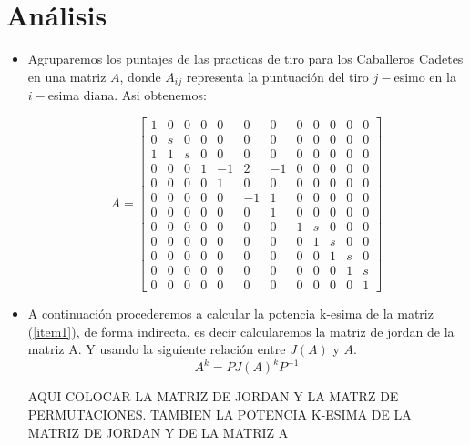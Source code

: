 \documentclass[12pt,a4paper]{article}
\begin{document}
\section{Análisis}
\begin{itemize}

	\item Agruparemos los puntajes de las practicas de tiro para los Caballeros Cadetes en una matriz $A$, donde $A_{ij}$ representa la puntuación del tiro $j-$esimo en la $i-$esima diana. Asi obtenemos:

\setcounter{MaxMatrixCols}{20}
\begin{equation}\label{item1}
A = \begin{bmatrix}
1& 0& 0& 0&  0&  0&  0& 0& 0& 0& 0& 0\\
0& s& 0& 0&  0&  0&  0& 0& 0& 0& 0& 0\\
1& 1& s& 0&  0&  0&  0& 0& 0& 0& 0& 0\\
0& 0& 0& 1& -1&  2& -1& 0& 0& 0& 0& 0\\
0& 0& 0& 0&  1&  0&  0& 0& 0& 0& 0& 0\\
0& 0& 0& 0&  0& -1&  1& 0& 0& 0& 0& 0\\
0& 0& 0& 0&  0&  0&  1& 0& 0& 0& 0& 0\\
0& 0& 0& 0&  0&  0&  0& 1& s& 0& 0& 0\\
0& 0& 0& 0&  0&  0&  0& 0& 1& s& 0& 0\\
0& 0& 0& 0&  0&  0&  0& 0& 0& 1& s& 0\\
0& 0& 0& 0&  0&  0&  0& 0& 0& 0& 1& s\\
0& 0& 0& 0&  0&  0&  0& 0& 0& 0& 0& 1
\end{bmatrix}
\end{equation}

	\item A continuación procederemos a calcular la potencia k-esima de la matriz  (\ref{item1}), de forma indirecta, es decir calcularemos la matriz de jordan de la matriz A. Y usando la siguiente relación entre $J(A)$ y $A$.
	$$A^{k} = PJ(A)^{k}P^{-1}$$
	
	AQUI COLOCAR LA MATRIZ DE JORDAN Y LA MATRZ DE PERMUTACIONES. TAMBIEN LA POTENCIA K-ESIMA DE LA MATRIZ DE JORDAN Y DE LA MATRIZ A
	

\end{itemize}
\end{document}
